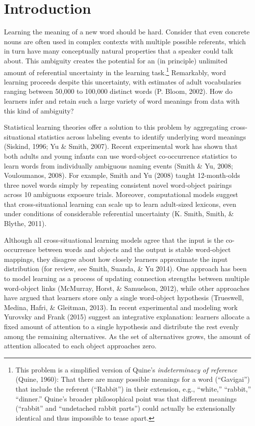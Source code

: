 \documentclass[oneside]{report}
\begin{document}
\section{Introduction}\label{introduction-3}

Learning the meaning of a new word should be hard. Consider that even
concrete nouns are often used in complex contexts with multiple possible
referents, which in turn have many conceptually natural properties that
a speaker could talk about. This ambiguity creates the potential for an
(in principle) unlimited amount of referential uncertainty in the
learning task.\footnote{This problem is a simplified version of Quine's
  \textit{indeterminacy of reference} (Quine, 1960): That there are many
  possible meanings for a word (``Gavigai'') that include the referent
  (``Rabbit'') in their extension, e.g., ``white,'' ``rabbit,''
  ``dinner.'' Quine's broader philosophical point was that different
  meanings (``rabbit'' and ``undetached rabbit parts'') could actually
  be extensionally identical and thus impossible to tease apart.}
Remarkably, word learning proceeds despite this uncertainty, with
estimates of adult vocabularies ranging between 50,000 to 100,000
distinct words (P. Bloom, 2002). How do learners infer and retain such a
large variety of word meanings from data with this kind of ambiguity?

Statistical learning theories offer a solution to this problem by
aggregating cross-situational statistics across labeling events to
identify underlying word meanings (Siskind, 1996; Yu \& Smith, 2007).
Recent experimental work has shown that both adults and young infants
can use word-object co-occurrence statistics to learn words from
individually ambiguous naming events (Smith \& Yu, 2008; Vouloumanos,
2008). For example, Smith and Yu (2008) taught 12-month-olds three novel
words simply by repeating consistent novel word-object pairings across
10 ambiguous exposure trials. Moreover, computational models suggest
that cross-situational learning can scale up to learn adult-sized
lexicons, even under conditions of considerable referential uncertainty
(K. Smith, Smith, \& Blythe, 2011).

Although all cross-situational learning models agree that the input is
the co-occurrence between words and objects and the output is stable
word-object mappings, they disagree about how closely learners
approximate the input distribution (for review, see Smith, Suanda, \& Yu
2014). One approach has been to model learning as a process of updating
connection strengths between multiple word-object links (McMurray,
Horst, \& Samuelson, 2012), while other approaches have argued that
learners store only a single word-object hypothesis (Trueswell, Medina,
Hafri, \& Gleitman, 2013). In recent experimental and modeling work
Yurovsky and Frank (2015) suggest an integrative explanation: learners
allocate a fixed amount of attention to a single hypothesis and
distribute the rest evenly among the remaining alternatives. As the set
of alternatives grows, the amount of attention allocated to each object
approaches zero.
\end{document}
